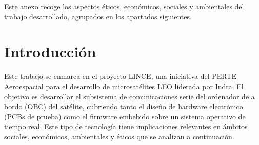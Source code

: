 \normalsize{Este anexo recoge los aspectos éticos, económicos, sociales y ambientales del
trabajo desarrollado, agrupados en los apartados siguientes.}
\vspace{0.1cm}

\section{Introducción}
\normalsize{Este trabajo se enmarca en el proyecto LINCE, una iniciativa del PERTE Aeroespacial para
el desarrollo de microsatélites LEO liderada por Indra. El objetivo es desarrollar el subsistema
de comunicaciones serie del ordenador de a bordo (OBC) del satélite, cubriendo tanto el
diseño de hardware electrónico (PCBs de prueba) como el firmware embebido sobre un
sistema operativo de tiempo real. Este tipo de tecnología tiene implicaciones relevantes en
ámbitos sociales, económicos, ambientales y éticos que se analizan a continuación.}
\vspace{0.3cm}

